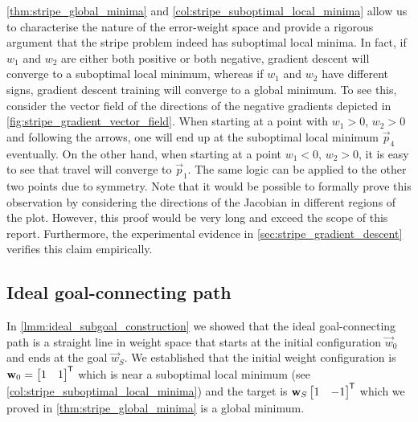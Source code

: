 \ref{thm:stripe_global_minima} and \ref{col:stripe_suboptimal_local_minima} allow us to characterise the nature of the error-weight space and provide a rigorous argument that the stripe problem indeed has suboptimal local minima.
In fact, if $w_1$ and $w_2$ are either both positive or both negative, gradient descent will converge to a suboptimal local minimum, whereas if $w_1$ and $w_2$ have different signs, gradient descent training will converge to a global minimum.
To see this, consider the vector field of the directions of the negative gradients depicted in \ref{fig:stripe_gradient_vector_field}.
When starting at a point with $w_1>0$, $w_2>0$ and following the arrows, one will end up at the suboptimal local minimum $\vec{p}_4$ eventually.
On the other hand, when starting at a point $w_1<0$, $w_2>0$, it is easy to see that travel will converge to $\vec{p}_1$.
The same logic can be applied to the other two points due to symmetry.
Note that it would be possible to formally prove this observation by considering the directions of the Jacobian in different regions of the plot. 
However, this proof would be very long and exceed the scope of this report. 
Furthermore, the experimental evidence in \ref{sec:stripe_gradient_descent} verifies this claim empirically.

\subsection{Ideal goal-connecting path}
\label{sec:stripe_ideal_goal_connecting_path}
In \ref{lmm:ideal_subgoal_construction} we showed that the ideal goal-connecting path is a straight line in weight space that starts at the initial configuration $\vec{w}_0$ and ends at the goal $\vec{w}_S$.
We established that the initial weight configuration is
$\mathbf{w}_0 = \begin{bmatrix}
    1 & 1
\end{bmatrix}^{\mkern-1.5mu\mathsf{T}}$
which is near a suboptimal local minimum (see \ref{col:stripe_suboptimal_local_minima}) and the target is 
$\mathbf{w}_S \begin{bmatrix}
    1 & -1
\end{bmatrix}^{\mkern-1.5mu\mathsf{T}}$
which we proved in \ref{thm:stripe_global_minima} is a global minimum.

